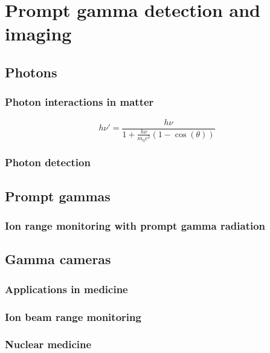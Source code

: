 \chapter{Prompt gamma detection and imaging}\label{chap::2}

\vfill

\minitoc

\newpage

\glsresetall

\section{Photons}

\subsection{Photon interactions in matter}

\begin{equation}
h\nu' = \frac{h\nu}{1+\frac{h\nu}{m_{0}c^2}(1-\cos(\theta))}
\label{chap2::eq::Compton}
\end{equation} 

\subsection{Photon detection}


\section{Prompt gammas}

\subsection{Ion range monitoring with prompt gamma radiation}

\section{Gamma cameras}

\subsection{Applications in medicine}

\subsection{Ion beam range monitoring}

\subsection{Nuclear medicine}

